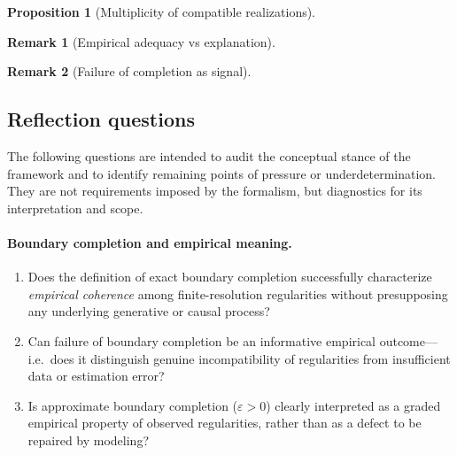 \documentclass[11pt]{article}
\newtheorem{proposition}{Proposition}
\newtheorem{remark}{Remark}
\begin{document}
\begin{proposition}[Multiplicity of compatible realizations]\label{prop:many-realizations}
\end{proposition}

\begin{remark}[Empirical adequacy vs explanation]\label{rem:adequacy-vs-explain}
\end{remark}

\begin{remark}[Failure of completion as signal]\label{rem:completion-failure}
\end{remark}

\subsection*{Reflection questions}

The following questions are intended to audit the conceptual stance of the framework and to
identify remaining points of pressure or underdetermination. They are not requirements imposed
by the formalism, but diagnostics for its interpretation and scope.

\paragraph{Boundary completion and empirical meaning.}
\begin{enumerate}
  \item Does the definition of exact boundary completion successfully characterize
  \emph{empirical coherence} among finite-resolution regularities without presupposing any
  underlying generative or causal process?

  \item Can failure of boundary completion be an informative empirical outcome---i.e.\ does it
  distinguish genuine incompatibility of regularities from insufficient data or estimation error?

  \item Is approximate boundary completion ($\varepsilon>0$) clearly interpreted as a graded
  empirical property of observed regularities, rather than as a defect to be repaired by modeling?
\end{enumerate}
\end{document}
